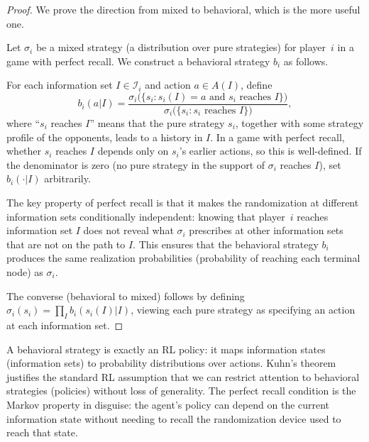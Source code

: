 \documentclass[11pt,a4paper]{article}
\theoremstyle{definition}
\theoremstyle{plain}
\theoremstyle{remark}
\begin{document}
\begin{proof}
We prove the direction from mixed to behavioral, which is the more useful one.

Let $\sigma_i$ be a mixed strategy (a distribution over pure strategies) for player~$i$
in a game with perfect recall. We construct a behavioral strategy $b_i$ as follows.

For each information set $I \in \mathcal{I}_i$ and action $a \in A(I)$, define
\[
    b_i(a | I) = \frac{\sigma_i\big(\{s_i : s_i(I) = a \text{ and }
    s_i \text{ reaches } I\}\big)}
    {\sigma_i\big(\{s_i : s_i \text{ reaches } I\}\big)},
\]
where ``$s_i$ reaches $I$'' means that the pure strategy $s_i$, together with some
strategy profile of the opponents, leads to a history in $I$. In a game with perfect
recall, whether $s_i$ reaches $I$ depends only on $s_i$'s earlier actions, so this
is well-defined. If the denominator is zero (no pure strategy in the support of
$\sigma_i$ reaches $I$), set $b_i(\cdot | I)$ arbitrarily.

The key property of perfect recall is that it makes the randomization at different
information sets conditionally independent: knowing that player~$i$ reaches information
set $I$ does not reveal what $\sigma_i$ prescribes at other information sets that are
not on the path to $I$. This ensures that the behavioral strategy $b_i$ produces the
same realization probabilities (probability of reaching each terminal node) as $\sigma_i$.

The converse (behavioral to mixed) follows by defining $\sigma_i(s_i) = \prod_I b_i(s_i(I)|I)$,
viewing each pure strategy as specifying an action at each information set.
\end{proof}

\begin{rlconnection}
A behavioral strategy is exactly an RL policy: it maps information states (information
sets) to probability distributions over actions. Kuhn's theorem justifies the standard
RL assumption that we can restrict attention to behavioral strategies (policies)
without loss of generality. The perfect recall condition is the Markov property in
disguise: the agent's policy can depend on the current information state without
needing to recall the randomization device used to reach that state.
\end{rlconnection}

\end{document}

